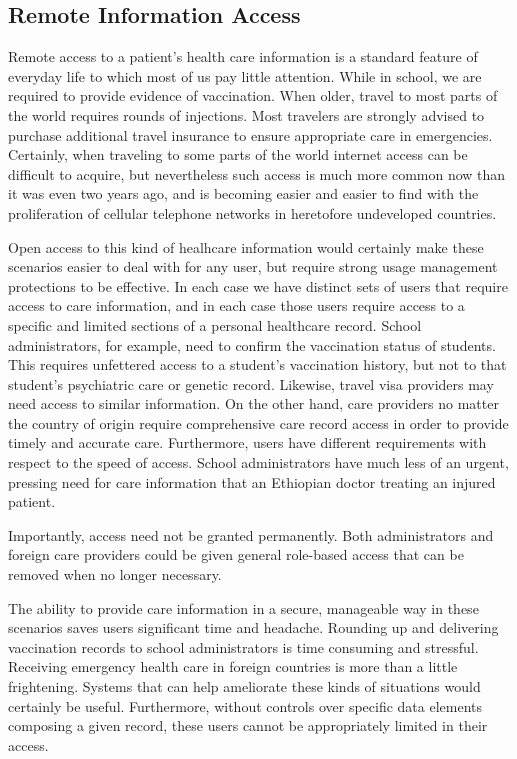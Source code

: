 \documentclass[10pt, conference, compsocconf]{IEEEtran}
\begin{document}
\subsection{Remote Information Access}
Remote access to a patient's health care information is a standard feature of everyday life to which most of us pay little attention.  While in school, we are required to provide evidence of vaccination.  When older, travel to most parts of the world requires rounds of injections.  Most travelers are strongly advised to purchase additional travel insurance to ensure appropriate care in emergencies.  Certainly, when traveling to some parts of the world internet access can be difficult to acquire, but nevertheless such access is much more common now than it was even two years ago, and is becoming easier and easier to find with the proliferation of cellular telephone networks in heretofore undeveloped countries.  

Open access to this kind of healhcare information would certainly make these scenarios easier to deal with for any user, but require strong usage management protections to be effective.  In each case we have distinct sets of users that require access to care information, and in each case those users require access to a specific and limited sections of a personal healthcare record.  School administrators, for example, need to confirm the vaccination status of students.  This requires unfettered access to a student's vaccination history, but not to that student's psychiatric care or genetic record.  Likewise, travel visa providers may need access to similar information.  On the other hand, care providers no matter the country of origin require comprehensive care record access in order to provide timely and accurate care.  Furthermore, users have different requirements with respect to the speed of access.  School administrators have much less of an urgent, pressing need for care information that an Ethiopian doctor treating an injured patient.  

Importantly, access need not be granted permanently.  Both administrators and foreign care providers could be given general role-based access that can be removed when no longer necessary.

The ability to provide care information in a secure, manageable way in these scenarios saves users significant time and headache.  Rounding up and delivering vaccination records to school administrators is time consuming and stressful.  Receiving emergency health care in foreign countries is more than a little frightening.  Systems that can help ameliorate these kinds of situations would certainly be useful.  Furthermore, without controls over specific data elements composing a given record, these users cannot be appropriately limited in their access.
\end{document}
